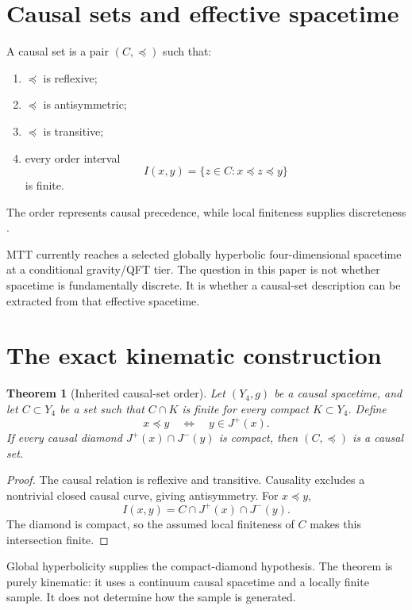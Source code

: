 \documentclass[11pt]{article}
\newtheorem{theorem}{Theorem}[section]
\theoremstyle{definition}
\theoremstyle{remark}
\begin{document}
\tableofcontents

\section{Causal sets and effective spacetime}

A causal set is a pair \((C,\preceq)\) such that:
\begin{enumerate}
\item \(\preceq\) is reflexive;
\item \(\preceq\) is antisymmetric;
\item \(\preceq\) is transitive;
\item every order interval
\[
 I(x,y)=\{z\in C:x\preceq z\preceq y\}
\]
is finite.
\end{enumerate}
The order represents causal precedence, while local finiteness supplies
discreteness \cite{Bombelli,Sorkin}.

MTT currently reaches a selected globally hyperbolic four-dimensional
spacetime at a conditional gravity/QFT tier. The question in this paper is
not whether spacetime is fundamentally discrete. It is whether a causal-set
description can be extracted from that effective spacetime.

\section{The exact kinematic construction}

\begin{theorem}[Inherited causal-set order]
\label{thm:inherit}
Let \((Y_4,g)\) be a causal spacetime, and let \(C\subset Y_4\) be a set such
that \(C\cap K\) is finite for every compact \(K\subset Y_4\). Define
\[
 x\preceq y
 \quad\Longleftrightarrow\quad
 y\in J^+(x).
\]
If every causal diamond \(J^+(x)\cap J^-(y)\) is compact, then
\((C,\preceq)\) is a causal set.
\end{theorem}

\begin{proof}
The causal relation is reflexive and transitive. Causality excludes a
nontrivial closed causal curve, giving antisymmetry. For \(x\preceq y\),
\[
 I(x,y)
 =
 C\cap J^+(x)\cap J^-(y).
\]
The diamond is compact, so the assumed local finiteness of \(C\) makes this
intersection finite.
\end{proof}

Global hyperbolicity supplies the compact-diamond hypothesis. The theorem is
purely kinematic: it uses a continuum causal spacetime and a locally finite
sample. It does not determine how the sample is generated.
\end{document}
